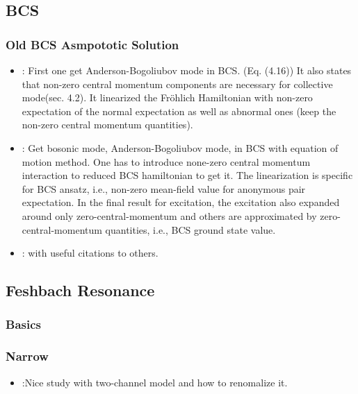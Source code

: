 \subsection{BCS}
\subsubsection{Old BCS Asmpototic Solution}
\begin{itemize}
 \item \cite{BogoliubovColl}: First one get Anderson-Bogoliubov mode in BCS.  (Eq. (4.16))  It also states that non-zero central momentum components are necessary for collective mode(sec. 4.2).  It linearized the Fr\"{o}hlich Hamiltonian with non-zero expectation of the normal expectation as well as abnormal ones (keep the non-zero central momentum quantities). 
  \item \cite{AndersonBCS}: Get bosonic mode, Anderson-Bogoliubov mode, in BCS with  equation of motion method.  One has to introduce none-zero central momentum interaction to reduced BCS hamiltonian to get it.  The linearization is specific for BCS ansatz, i.e., non-zero mean-field value for anonymous pair expectation. In the final result for excitation, the excitation also expanded around only zero-central-momentum and others are approximated by zero-central-momentum quantities, i.e., BCS ground state value. 
 
	\item \cite{BcsExact}: with useful citations to others.         
 \end{itemize}

\subsection{Feshbach Resonance}
\subsubsection{Basics}
\subsubsection{Narrow}
\begin{itemize}
  \item \cite{JacksonNarrow}:Nice study with two-channel model and how to renomalize it. 
	
 \end{itemize}
